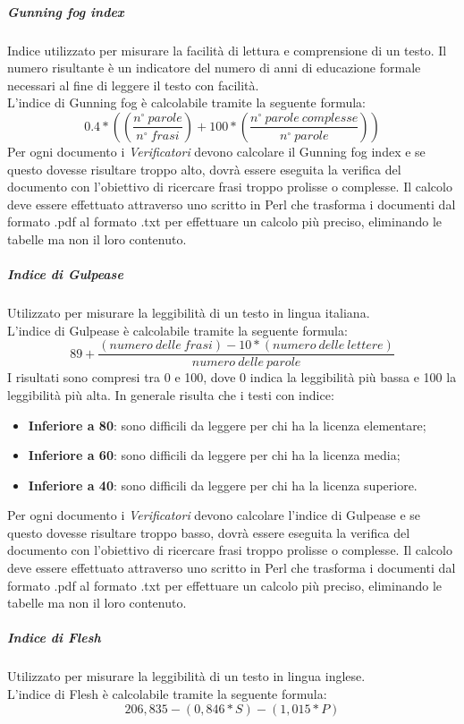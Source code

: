 \subparagraph{Gunning fog index}\Spazio
Indice utilizzato per misurare la facilità di lettura e comprensione di un testo. Il numero risultante è un indicatore del numero di anni di educazione formale necessari al fine di leggere il testo con facilità. \\
L'indice di Gunning fog è calcolabile tramite la seguente formula:
$$
0.4*((\frac{n^{\circ}\:parole}{n^{\circ}\:frasi})+100*(\frac{n^{\circ}\:parole\:complesse}{n^{\circ}\:parole}))
$$
Per ogni documento i \emph{Verificatori} devono calcolare il Gunning fog index e se questo dovesse risultare troppo alto, dovrà essere eseguita la verifica del documento con l'obiettivo di ricercare frasi troppo prolisse o complesse. Il calcolo deve essere effettuato attraverso uno  scritto in Perl che trasforma i documenti dal formato .pdf al formato .txt per effettuare un calcolo più preciso, eliminando le tabelle ma non il loro contenuto.
\subparagraph{Indice di Gulpease}\Spazio
Utilizzato per misurare la leggibilità di un testo in lingua italiana.\\
L'indice di Gulpease è calcolabile tramite la seguente formula:
$$
89+\frac{(numero\:delle\:frasi)-10*(numero\:delle\:lettere)}{numero\:delle\:parole}
$$
I risultati sono compresi tra 0 e 100, dove 0 indica la leggibilità più bassa e 100 la leggibilità più alta. In generale risulta che i testi con indice:
\begin{itemize}
	\item{\textbf{Inferiore	a 80}}: sono difficili da leggere per chi ha la licenza elementare;
	\item{\textbf{Inferiore	a 60}}: sono difficili da leggere per chi ha la licenza media;
	\item{\textbf{Inferiore	a 40}}: sono difficili da leggere per chi ha la licenza superiore.
\end{itemize}
Per ogni documento i \emph{Verificatori} devono calcolare l'indice di Gulpease e se questo dovesse risultare troppo basso, dovrà essere eseguita la verifica del documento con l'obiettivo di ricercare frasi troppo prolisse o complesse. Il calcolo deve essere effettuato attraverso uno  scritto in Perl che trasforma i documenti dal formato .pdf al formato .txt per effettuare un calcolo più preciso, eliminando le tabelle ma non il loro contenuto.
\subparagraph{Indice di Flesh}\Spazio
Utilizzato per misurare la leggibilità di un testo in lingua inglese.\\
L'indice di Flesh è calcolabile tramite la seguente formula:
$$
206,835-(0,846*S)-(1,015*P)
$$
